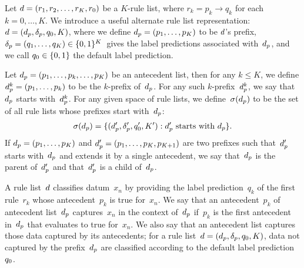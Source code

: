 Let ${{d} = (r_1, r_2, \dots, r_K, r_0)}$ be a $K$-rule list,
where ${r_k = p_k \rightarrow q_k}$ for each ${k = 0, \dots, K}$.
%
We introduce a useful alternate rule list representation:
${{d} = (d_p, \delta_p, q_0, K)}$,
where we define ${d_p = (p_1, \dots, p_K)}$ to be ${d}$'s prefix,
${\delta_p = (q_1, \dots, q_K) \in \{0, 1\}^K}$~gives
the label predictions associated with~$d_p$,
and we call ${q_0 \in \{0, 1\}}$ the default label prediction.

Let ${d_p = (p_1, \dots, p_k, \dots, p_K)}$ be an antecedent list,
then for any ${k \le K}$, we define ${d_p^k = (p_1, \dots, p_k)}$
to be the $k$-prefix of~$d_p$.
%
For any such $k$-prefix~$d_p^k$,
we say that~$d_p$ starts with~$d_p^k$.
%
For any given space of rule lists,
we define~$\sigma(d_p)$ to be the set of
all rule lists whose prefixes start with~$d_p$:
\begin{align}
\StartsWith(\Prefix) =
\{(\Prefix', \Labels', \Default', K') : \Prefix' \textnormal{ starts with } \Prefix \}.
\label{eq:starts-with}
\end{align}
%
If ${d_p = (p_1, \dots, p_K)}$ and ${d_p' = (p_1, \dots, p_K, p_{K+1})}$
are two prefixes such that~$d_p'$ starts with~$d_p$ and extends it by
a single antecedent, we say that~$d_p$ is the parent of~$d_p'$
and that~$d_p'$ is a child of~$d_p$.

A rule list~${d}$ classifies datum~$x_n$ by providing the label prediction~$q_k$
of the first rule~$r_k$ whose antecedent~$p_k$ is true for~$x_n$.
%
We say that an antecedent~$p_k$ of antecedent list~$d_p$ captures~$x_n$
in the context of~$d_p$ if~$p_k$ is the first antecedent in~$d_p$ that
evaluates to true for~$x_n$.
%
We also say that an antecedent list captures those data captured by its antecedents;
for a rule list~${{d} = (d_p, \delta_p, q_0, K)}$,
data not captured by the prefix~$d_p$
are classified according to the default label prediction~$q_0$.

